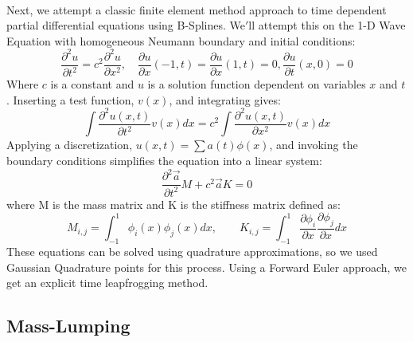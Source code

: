 \documentclass{article}
\begin{document}
\paragraph{}
Next, we attempt a classic finite element method approach to time dependent partial differential equations using B-Splines. We$'$ll attempt this on the 1-D Wave Equation with homogeneous Neumann boundary and initial conditions: 
\begin{equation*}
\frac{\partial ^2 u}{\partial t^2} = c^2\frac{\partial ^2 u}{\partial x^2},\quad \frac{\partial u}{\partial x}(-1,t)=\frac{\partial u}{\partial x}(1,t)=0, \frac{\partial u}{\partial t}(x,0)=0
\end{equation*}
Where $c$ is a constant and $u$ is a solution function dependent on variables $x$ and $t$. Inserting a test function, $v(x)$, and integrating gives: 
\begin{equation*}
\int \frac{\partial ^2 u(x,t)}{\partial t^2}v(x)dx = c^2\int \frac{\partial ^2 u(x,t)}{\partial x^2}v(x)dx
\end{equation*}
Applying a discretization, $u(x,t) = \sum a(t)\phi(x)$, and invoking the boundary conditions simplifies the equation into a linear system:
\begin{equation*}
\frac{\partial ^2\vec{a}}{\partial t^2}M + c^2\vec{a}K=0
\end{equation*}
where M is the mass matrix and K is the stiffness matrix defined as:
\begin{equation*}
M_{i,j}=\int ^1_{-1}\phi _i(x)\phi _j(x)dx,\qquad K_{i,j}=\int ^1_{-1}\frac{\partial \phi _i}{\partial x}\frac{\partial \phi _j}{\partial x}dx
\end{equation*}
These equations can be solved using quadrature approximations, so we used Gaussian Quadrature points for this process. Using a Forward Euler approach, we get an explicit time leapfrogging method.

\subsection*{Mass-Lumping}
\end{document}
